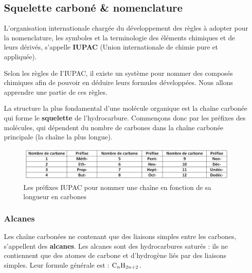 \documentclass[11pt,a4paper]{article}
\begin{document}
\subsection{Squelette carboné \& nomenclature}

L'organisation internationale chargée du développement des règles à adopter pour la nomenclature, les symboles et la terminologie des éléments chimiques et de leurs dérivés, s'appelle \textbf{IUPAC} (Union internationale de chimie pure et appliquée). 

Selon les règles de I’IUPAC, il existe un système pour nommer des composés chimiques afin de pouvoir en déduire leurs formules développées. Nous allons apprendre une partie de ces règles. 

La structure la plus fondamental d'une molécule organique est la chaîne carbonée qui forme le \textbf{squelette} de l'hydrocarbure. Commençons donc par les préfixes des molécules, qui dépendent du nombre de carbones dans la chaîne carbonée principale (la chaîne la plus longue). 

\begin{figure}[h]
    \centering
    \includegraphics[width=\linewidth]{imgs/c5/prefixe.jpg}
    \caption{Les préfixes IUPAC pour nommer une chaîne en fonction de sa longueur en carbones}
    \label{fig:prefixes}
\end{figure}

\subsubsection{Alcanes}
Les chaîne carbonées ne contenant que des liaisons simples entre les carbones, s'appellent des \textbf{alcanes}. Les alcanes sont des hydrocarbures saturés : ils ne contiennent que des atomes de carbone et d’hydrogène liés par des liaisons simples.  Leur formule générale est : $\ce{C_nH_{2n+2}}$.
\end{document}
